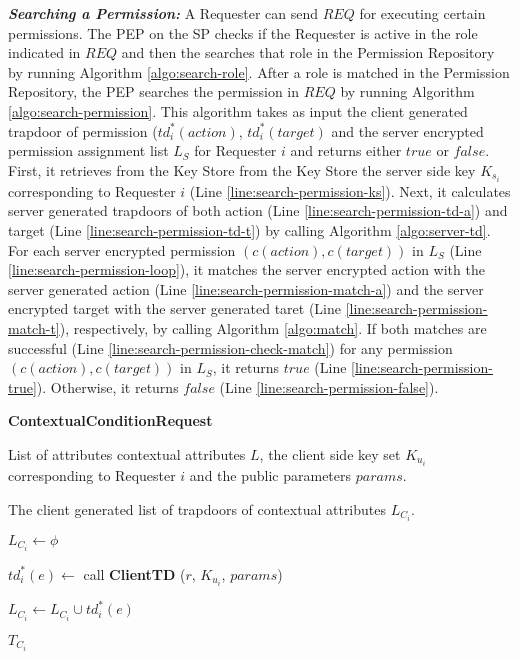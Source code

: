 \documentclass[final,5p,times,twocolumn]{elsarticle}
\newcommand{\algofontsize}{\fontsize{7}{8}\selectfont}
\begin{document}
\emph{\textbf{Searching a Permission:}} A Requester can send $\mathit{REQ}$ for executing certain permissions. The PEP on the SP checks if the Requester is active in the role indicated in $\mathit{REQ}$ and then the searches that role in the Permission Repository by running Algorithm \ref{algo:search-role}. After a role is matched in the Permission Repository, the PEP searches the permission in $\mathit{REQ}$ by running Algorithm \ref{algo:search-permission}. This algorithm takes as input the client generated trapdoor of permission ($td^*_i (action)$, $td^*_i (target)$ and the server encrypted permission assignment list $L_{S}$ for Requester $i$ and returns either $\mathit{true}$ or $\mathit{false}$. First, it retrieves from the Key Store from the Key Store the server side key $K_{s_i}$ corresponding to Requester $i$ (Line \ref{line:search-permission-ks}). Next, it calculates server generated trapdoors of both action (Line \ref{line:search-permission-td-a}) and target (Line \ref{line:search-permission-td-t}) by calling Algorithm \ref{algo:server-td}. For each server encrypted permission $(c(action), c(target))$ in $L_{S}$ (Line \ref{line:search-permission-loop}), it matches the server encrypted action with the server generated action (Line \ref{line:search-permission-match-a}) and the server encrypted target with the server generated taret (Line \ref{line:search-permission-match-t}), respectively, by calling Algorithm \ref{algo:match}. If both matches are successful (Line \ref{line:search-permission-check-match}) for any permission $(c(action), c(target))$ in $L_{S}$, it returns $\mathit{true}$ (Line \ref{line:search-permission-true}). Otherwise, it returns $\mathit{false}$ (Line \ref{line:search-permission-false}).




\begin{algorithm}[htp]
{\algofontsize
\caption{\textbf{ContextualConditionRequest}}

\label{algo:request-contextual-condition}

\begin{algorithmic}[1]

\REQUIRE List of attributes contextual attributes $L$, the client side key set $K_{u_i}$ corresponding to Requester $i$ and the public parameters $params$.

\ENSURE The client generated list of trapdoors of contextual attributes $L_{C_i}$.

\medskip

\STATE $L_{C_i} \leftarrow \phi$ \label{request-cc-init}

 \label{request-cc-loop}

	\STATE $td^*_i (e) \leftarrow$ call \textbf{ClientTD} ($r$, $K_{u_i}$, $params$) \label{request-cc-td}
	
	\STATE $L_{C_i} \leftarrow L_{C_i} \cup td^*_i (e)$ \label{request-cc-update}

\ENDFOR

\RETURN $T_{C_i}$

\end{algorithmic}
}
\end{algorithm}
\end{document}
